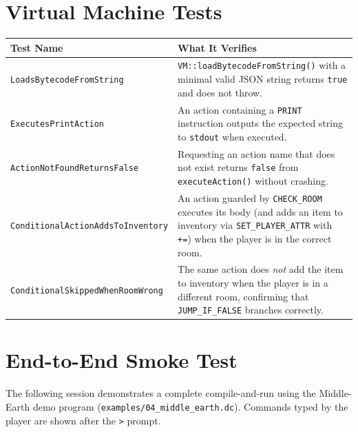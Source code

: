 \documentclass[12pt, a4paper]{article}
\begin{document}
\section{Virtual Machine Tests}

\begin{longtable}{p{6.5cm} p{7cm}}
\toprule
\textbf{Test Name} & \textbf{What It Verifies} \\
\midrule
\endhead
\texttt{LoadsBytecodeFromString} &
  \texttt{VM::loadBytecodeFromString()} with a minimal valid JSON string returns
  \texttt{true} and does not throw. \\[4pt]

\texttt{ExecutesPrintAction} &
  An action containing a \texttt{PRINT} instruction outputs the expected string
  to \texttt{stdout} when executed. \\[4pt]

\texttt{ActionNotFoundReturnsFalse} &
  Requesting an action name that does not exist returns \texttt{false} from
  \texttt{executeAction()} without crashing. \\[4pt]

\texttt{ConditionalActionAddsToInventory} &
  An action guarded by \texttt{CHECK\_ROOM} executes its body (and adds an item
  to inventory via \texttt{SET\_PLAYER\_ATTR} with \texttt{+=}) when the player is
  in the correct room. \\[4pt]

\texttt{ConditionalSkippedWhenRoomWrong} &
  The same action does \emph{not} add the item to inventory when the player is in
  a different room, confirming that \texttt{JUMP\_IF\_FALSE} branches correctly. \\
\bottomrule
\end{longtable}

\section{End-to-End Smoke Test}

The following session demonstrates a complete compile-and-run using the
Middle-Earth demo program (\texttt{examples/04\_middle\_earth.dc}).
Commands typed by the player are shown after the \texttt{>} prompt.
\end{document}
